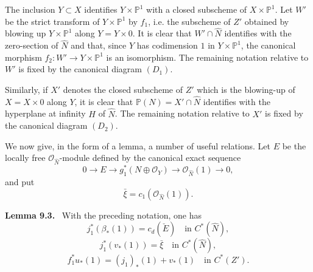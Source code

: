 \documentclass[11pt]{article}
\newenvironment{statement}[1]{\par\medskip\noindent\textbf{#1.}\ }{\par\medskip}
\begin{document}
The inclusion $Y\subset X$ identifies $Y\times\mathbb P^1$ with a closed subscheme of $X\times\mathbb P^1$. Let $W'$ be the strict transform of $Y\times\mathbb P^1$ by $f_1$, i.e. the subscheme of $Z'$ obtained by blowing up $Y\times\mathbb P^1$ along $Y=Y\times0$. It is clear that $W'\cap\widehat N$ identifies with the zero-section of $\widehat N$ and that, since $Y$ has codimension $1$ in $Y\times\mathbb P^1$, the canonical morphism $f_2:W'\to Y\times\mathbb P^1$ is an isomorphism. The remaining notation relative to $W'$ is fixed by the canonical diagram $(D_1)$.

Similarly, if $X'$ denotes the closed subscheme of $Z'$ which is the blowing-up of $X=X\times0$ along $Y$, it is clear that $\mathbb P(N)=X'\cap\widehat N$ identifies with the hyperplane at infinity $H$ of $\widehat N$. The remaining notation relative to $X'$ is fixed by the canonical diagram $(D_2)$.

We now give, in the form of a lemma, a number of useful relations. Let $E$ be the locally free $\mathcal O_{\widehat N}$-module defined by the canonical exact sequence
\[
0\to E\to g_1^*(N\oplus\mathcal O_Y)\to\mathcal O_{\widehat N}(1)\to0,
\tag{9.3.0}
\]
and put
\[
\bar\xi=c_1(\mathcal O_{\widehat N}(1)).
\tag{9.3.1}
\]

\begin{statement}{Lemma 9.3}
With the preceding notation, one has
\[
j_1^*(\beta_*(1))=c_d(\check E)\quad\text{in }C^*(\widehat N),
\tag{9.3.2}
\]
\[
j_1^*(v_*(1))=\bar\xi\quad\text{in }C^*(\widehat N),
\tag{9.3.3}
\]
\[
f_1^*u_*(1)=(j_1)_*(1)+v_*(1)\quad\text{in }C^*(Z').
\tag{9.3.4}
\]
\end{statement}
\end{document}
